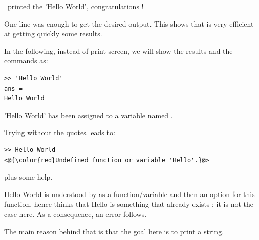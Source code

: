 		\matlab~printed the 'Hello World', congratulations !

		One line was enough to get the desired output.
		This shows that \matlab is very efficient at getting quickly some results. 
		\medskip
		
		In the following, instead of print screen, we will show the results and the commands as:
\begin{lstlisting}
>> 'Hello World'
ans =
Hello World
\end{lstlisting}

		
		'Hello World' has been assigned to a variable named .




		Trying without the quotes leads to:
\begin{lstlisting}
>> Hello World
<@{\color{red}Undefined function or variable 'Hello'.}@>
\end{lstlisting}
		plus some help.

		Hello World is understood by \matlab as a function/variable and then an option for this function.
		\matlab hence thinks that Hello is something that already exists ; it is not the case here. As a consequence, an error follows.

		The main reason behind that is that the goal here is to print a string.


